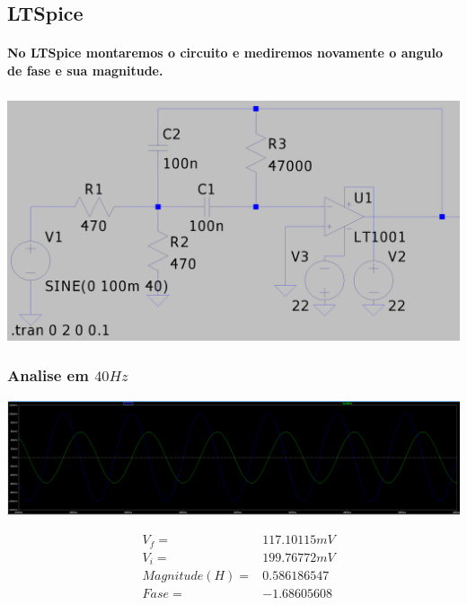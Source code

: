 \documentclass[12pt,twoside, a4paper, twocolumn]{article}
\begin{document}
\newpage

\subsection{LTSpice}

\paragraph*{No LTSpice montaremos o circuito e mediremos novamente o angulo de fase e sua magnitude.}
\subparagraph*{}
\begin{adjustbox}{scale=0.09}
    \includegraphics{ltspicecirc.png}
\end{adjustbox}

\subsubsection{Analise em $40Hz$}

\begin{adjustbox}{scale=0.09}
    \includegraphics{ltfreq40.png}
\end{adjustbox}

\begin{equation*}
    \begin{aligned}
         & V_f =          & 117.10115mV \\
         & V_i =          & 199.76772mV \\
         & Magnitude(H) = & 0.586186547 \\
         & Fase =         & -1.68605608
    \end{aligned}
\end{equation*}
\end{document}
